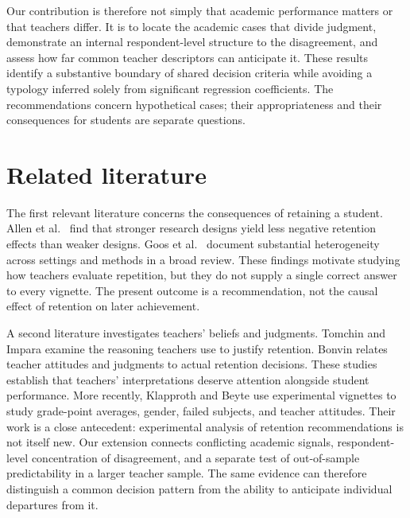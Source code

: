 
Our contribution is therefore not simply that academic performance matters or that teachers differ. It is to locate the academic cases that divide judgment, demonstrate an internal respondent-level structure to the disagreement, and assess how far common teacher descriptors can anticipate it. These results identify a substantive boundary of shared decision criteria while avoiding a typology inferred solely from significant regression coefficients. The recommendations concern hypothetical cases; their appropriateness and their consequences for students are separate questions.

\section{Related literature}
The first relevant literature concerns the consequences of retaining a student. Allen et al.\ \cite{allen} find that stronger research designs yield less negative retention effects than weaker designs. Goos et al.\ \cite{goos} document substantial heterogeneity across settings and methods in a broad review. These findings motivate studying how teachers evaluate repetition, but they do not supply a single correct answer to every vignette. The present outcome is a recommendation, not the causal effect of retention on later achievement.

A second literature investigates teachers' beliefs and judgments. Tomchin and Impara \cite{tomchin} examine the reasoning teachers use to justify retention. Bonvin \cite{bonvin} relates teacher attitudes and judgments to actual retention decisions. These studies establish that teachers' interpretations deserve attention alongside student performance. More recently, Klapproth and Beyte \cite{klapproth} use experimental vignettes to study grade-point averages, gender, failed subjects, and teacher attitudes. Their work is a close antecedent: experimental analysis of retention recommendations is not itself new. Our extension connects conflicting academic signals, respondent-level concentration of disagreement, and a separate test of out-of-sample predictability in a larger teacher sample. The same evidence can therefore distinguish a common decision pattern from the ability to anticipate individual departures from it.

